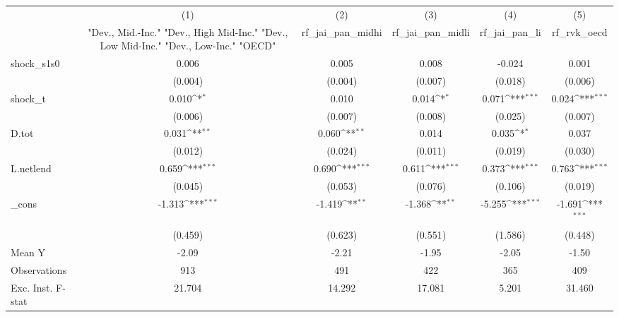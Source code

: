 {
\def\sym#1{\ifmmode^{#1}\else\(^{#1}\)\fi}
\begin{tabular}{l*{5}{c}}
\toprule
            &\multicolumn{1}{c}{(1)}&\multicolumn{1}{c}{(2)}&\multicolumn{1}{c}{(3)}&\multicolumn{1}{c}{(4)}&\multicolumn{1}{c}{(5)}\\
            &\multicolumn{1}{c}{ "Dev., Mid.-Inc." "Dev., High Mid-Inc." "Dev., Low Mid-Inc." "Dev., Low-Inc." "OECD" }&\multicolumn{1}{c}{rf\_jai\_pan\_midhi}&\multicolumn{1}{c}{rf\_jai\_pan\_midli}&\multicolumn{1}{c}{rf\_jai\_pan\_li}&\multicolumn{1}{c}{rf\_rvk\_oecd}\\
\midrule
shock\_s1s0  &       0.006         &       0.005         &       0.008         &      -0.024         &       0.001         \\
            &     (0.004)         &     (0.004)         &     (0.007)         &     (0.018)         &     (0.006)         \\
\addlinespace
shock\_t     &       0.010\sym{*}  &       0.010         &       0.014\sym{*}  &       0.071\sym{***}&       0.024\sym{***}\\
            &     (0.006)         &     (0.007)         &     (0.008)         &     (0.025)         &     (0.007)         \\
\addlinespace
D.tot       &       0.031\sym{**} &       0.060\sym{**} &       0.014         &       0.035\sym{*}  &       0.037         \\
            &     (0.012)         &     (0.024)         &     (0.011)         &     (0.019)         &     (0.030)         \\
\addlinespace
L.netlend   &       0.659\sym{***}&       0.690\sym{***}&       0.611\sym{***}&       0.373\sym{***}&       0.763\sym{***}\\
            &     (0.045)         &     (0.053)         &     (0.076)         &     (0.106)         &     (0.019)         \\
\addlinespace
\_cons      &      -1.313\sym{***}&      -1.419\sym{**} &      -1.368\sym{**} &      -5.255\sym{***}&      -1.691\sym{***}\\
            &     (0.459)         &     (0.623)         &     (0.551)         &     (1.586)         &     (0.448)         \\
\midrule
Mean Y      &       -2.09         &       -2.21         &       -1.95         &       -2.05         &       -1.50         \\
Observations&         913         &         491         &         422         &         365         &         409         \\
Exc. Inst. F-stat&      21.704         &      14.292         &      17.081         &       5.201         &      31.460         \\
\bottomrule
\end{tabular}
}
